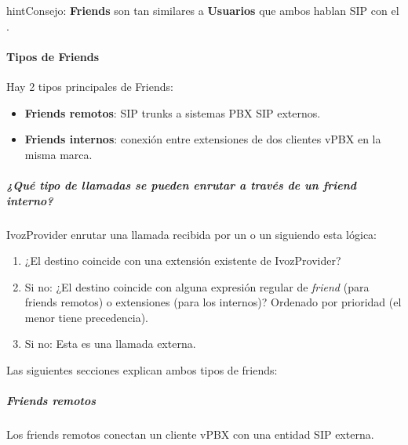 \documentclass[letterpaper,10pt,spanish]{sphinxmanual}
\begin{document}
\begin{notice}{hint}{Consejo:}
\textbf{Friends} son tan similares a \textbf{Usuarios} que ambos hablan SIP con el {\hyperref[administration_portal/platform/infrastructure/proxy_users:proxyusers]{}}.
\end{notice}


\paragraph{Tipos de Friends}
\label{administration_portal/client/vpbx/routing_endpoints/friends/index:types-of-friends}
Hay 2 tipos principales de Friends:
\begin{itemize}
\item {} 
\textbf{Friends remotos}: SIP trunks a sistemas PBX SIP externos.

\item {} 
\textbf{Friends internos}: conexión entre extensiones de dos clientes vPBX en la misma marca.

\end{itemize}


\subparagraph{¿Qué tipo de llamadas se pueden enrutar a través de un \emph{friend interno}?}
\label{administration_portal/client/vpbx/routing_endpoints/friends/index:what-kind-of-calls-can-be-routed-through-an-internal-friend}
IvozProvider enrutar una llamada recibida por un {\hyperref[administration_portal/client/vpbx/users:users]{}} o un {\hyperref[administration_portal/client/vpbx/routing_endpoints/friends/index:friends]{}} siguiendo esta lógica:
\begin{enumerate}
\item {} 
¿El destino coincide con una extensión existente de IvozProvider?

\item {} 
Si no: ¿El destino coincide con alguna expresión regular de \emph{friend} (para friends remotos) o extensiones (para los internos)? Ordenado por prioridad (el menor tiene precedencia).

\item {} 
Si no: Esta es una llamada externa.

\end{enumerate}

Las siguientes secciones explican ambos tipos de friends:


\subparagraph{Friends remotos}
\label{administration_portal/client/vpbx/routing_endpoints/friends/remote_friends:remote-friends}\label{administration_portal/client/vpbx/routing_endpoints/friends/remote_friends::doc}
Los friends remotos conectan un cliente vPBX con una entidad SIP externa.
\end{document}
